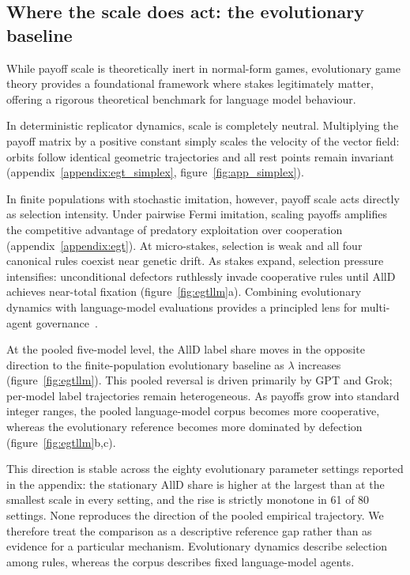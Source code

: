 \documentclass[11pt,a4paper]{article}
\newcommand{\lam}{\lambda}
\begin{document}
\subsection{Where the scale does act: the evolutionary baseline}\label{sec:egt_pointer}

While payoff scale is theoretically inert in normal-form games, evolutionary
game theory provides a foundational framework where stakes legitimately
matter, offering a rigorous theoretical benchmark for language model behaviour.

In deterministic replicator dynamics, scale is completely neutral. Multiplying
the payoff matrix by a positive constant simply scales the velocity of the
vector field: orbits follow identical geometric trajectories and all rest points
remain invariant (appendix~\ref{appendix:egt_simplex}, figure~\ref{fig:app_simplex}).

In finite populations with stochastic imitation, however, payoff scale acts
directly as selection intensity. Under pairwise Fermi imitation, scaling payoffs
amplifies the competitive advantage of predatory exploitation over cooperation
(appendix~\ref{appendix:egt}). At micro-stakes, selection is weak and all four
canonical rules coexist near genetic drift. As stakes expand, selection pressure
intensifies: unconditional defectors ruthlessly invade cooperative rules until
AllD achieves near-total fixation (figure~\ref{fig:egtllm}a). Combining
evolutionary dynamics with language-model evaluations provides a principled
lens for multi-agent governance~\cite{balabanova2025media,buscemi2025llms}.

At the pooled five-model level, the AllD label share moves in the opposite
direction to the finite-population evolutionary baseline as $\lam$ increases
(figure~\ref{fig:egtllm}). This pooled reversal is driven primarily by GPT and
Grok; per-model label trajectories remain heterogeneous. As payoffs grow into
standard integer ranges, the pooled language-model corpus becomes more
cooperative, whereas the evolutionary reference becomes more dominated by
defection (figure~\ref{fig:egtllm}b,c).

This direction is stable across the eighty evolutionary parameter settings
reported in the appendix: the stationary AllD share is higher at the largest
than at the smallest scale in every setting, and the rise is strictly monotone
in 61 of 80 settings. None reproduces the direction of the pooled empirical
trajectory.
We therefore treat the comparison as a descriptive reference gap rather than as
evidence for a particular mechanism. Evolutionary dynamics describe selection
among rules, whereas the corpus describes fixed language-model agents.
\end{document}
